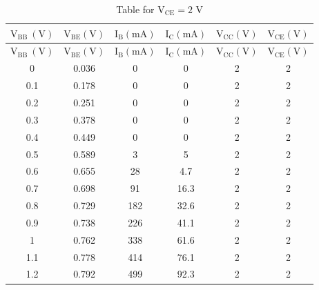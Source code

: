 \documentclass[12pt]{article}
\begin{document}
\begin{longtable}[H]{|c|c|c|c|c|c|}
    \caption{Table for \( \mathrm{V_{CE}} = 2\) V}
    \endfirsthead
    \hline
    $\mathrm{V_{BB} \ (V)}$ & $\mathrm{V_{BE} (V)}$ & $\mathrm{I_B (mA)}$ & $\mathrm{I_C (mA)}$ & $\mathrm{V_{CC} (V)}$ & $\mathrm{V_{CE} (V)}$ \\ \hline \hline
    \endhead
    \hline
    $\mathrm{V_{BB} \ (V)}$ & $\mathrm{V_{BE} (V)}$ & $\mathrm{I_B (mA)}$ & $\mathrm{I_C (mA)}$ & $\mathrm{V_{CC} (V)}$ & $\mathrm{V_{CE} (V)}$ \\ \hline \hline
    0         & 0.036     & 0            & 0            & 2     & 2             \\ \hline
    0.1       & 0.178     & 0            & 0            & 2     & 2             \\ \hline
    0.2       & 0.251     & 0            & 0            & 2     & 2             \\ \hline
    0.3       & 0.378     & 0            & 0            & 2     & 2             \\ \hline
    0.4       & 0.449     & 0            & 0            & 2     & 2             \\ \hline
    0.5       & 0.589     & 3            & 5            & 2     & 2             \\ \hline
    0.6       & 0.655     & 28           & 4.7          & 2     & 2             \\ \hline 
    0.7       & 0.698     & 91           & 16.3         & 2     & 2             \\ \hline
    0.8       & 0.729     & 182          & 32.6         & 2     & 2             \\ \hline
    0.9       & 0.738     & 226          & 41.1         & 2     & 2             \\ \hline
    1         & 0.762     & 338          & 61.6         & 2     & 2             \\ \hline 
    1.1       & 0.778     & 414          & 76.1         & 2     & 2             \\ \hline
    1.2       & 0.792     & 499          & 92.3         & 2     & 2             \\ \hline 
    
\end{longtable}
\end{document}
